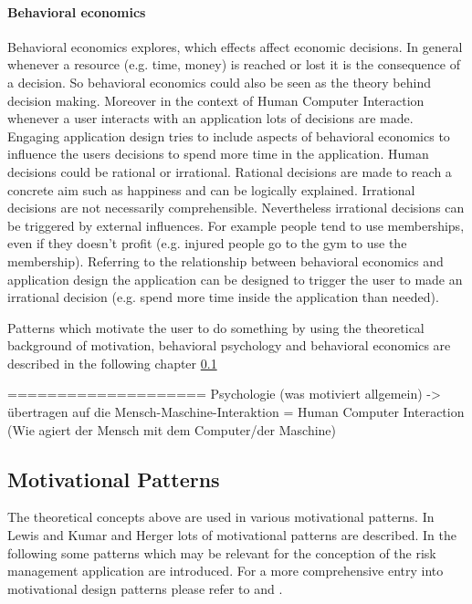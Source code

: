 \paragraph*{Behavioral economics}

Behavioral economics explores, which effects affect economic decisions. In general whenever a resource (e.g. time, money) is reached or lost it is the consequence of a decision. So behavioral economics could also be seen as the theory behind decision making. Moreover in the context of Human Computer Interaction whenever a user interacts with an application 
lots of decisions are made. Engaging application design tries to include aspects of behavioral economics to influence the users decisions to spend more time in the application. 
Human decisions could be rational or irrational. Rational decisions are made to reach a concrete aim such as happiness and can be logically explained. Irrational decisions are not necessarily comprehensible.  Nevertheless irrational decisions can be triggered by external influences. For example people tend to use memberships, even if they doesn't profit (e.g. injured people go to the gym to use the membership).
Referring to the relationship between behavioral economics and application design the application can be designed to trigger the user to made an irrational decision (e.g. spend more time inside the application than needed). \cite[p. 19]{lewisIrresistibleAppsMotivational2014}


Patterns which motivate the user to do something by using the theoretical background of motivation, behavioral psychology and behavioral economics are described in the following chapter \ref{sec:theoryBc}

====================\newline
Psychologie (was motiviert allgemein) -> übertragen auf die Mensch-Maschine-Interaktion = Human Computer Interaction (Wie agiert der Mensch mit dem Computer/der Maschine)

\subsection{Motivational Patterns}
\label{sec:theoryBc}

The theoretical concepts above are used in various motivational patterns. In Lewis \cite{lewisIrresistibleAppsMotivational2014} and Kumar and Herger \cite{inproceedings} lots of motivational patterns are described. In the following some patterns which may be relevant for the conception of the risk management application are introduced. For a more comprehensive entry into motivational design patterns please refer to \cite{lewisIrresistibleAppsMotivational2014} and \cite{inproceedings}.

